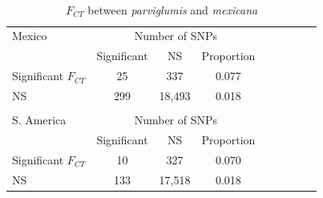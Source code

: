 \renewcommand{\arraystretch}{1.1}
\begin{table}[h]

\begin{center}
 \caption[]{$F_{CT}$ between \emph{parviglumis} and \emph{mexicana}\hspace*{0.3cm}}
  \textbf{}\\[-2mm]
{\fontsize{7}{11}\sf
    \begin{tabular}{lcccccccl} 
    \hline\hline
       
Mexico     & \multicolumn{3}{c}{Number of SNPs}  \\
                                  & Significant & NS          & Proportion  \\
Significant $F_{CT}$ & 25              &   337       & 0.077\\ 
NS                             & 299            &  18,493   & 0.018\\
      \hline
    & & \\[-3mm]
S. America     & \multicolumn{3}{c}{Number of SNPs} \\
                                     & Significant & NS           & Proportion  \\
Significant $F_{CT}$    & 10              &   327        & 0.070\\ 
NS                                & 133            &  17,518    & 0.018\\[1mm]
    \hline\hline
    \end{tabular}
    \label{tanja}  %
}
\end{center}
\end{table}
\renewcommand{\arraystretch}{1}


